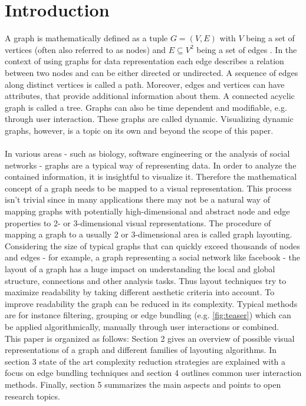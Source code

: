 \section{Introduction}
A graph is mathematically defined as a tuple $ G = (V, E)$ with $V$ being a set of vertices (often also referred to as nodes) and $E \subseteq V^2$ being a set of edges \cite{Al-Taie2017}. In the context of using graphs for data representation each edge describes a relation between two nodes and can be either directed or undirected. A sequence of edges along distinct vertices is called a path. Moreover, edges and vertices can have attributes, that provide additional information about them. A connected acyclic graph is called a tree. Graphs can also be time dependent and modifiable, e.g. through user interaction. These graphs are called dynamic. Visualizing dynamic graphs, however, is a topic on its own and beyond the scope of this paper.\\
\\
In various areas - such as biology, software engineering or the analysis of social networks - graphs are a typical way of representing data. In order to analyze the contained information, it is insightful to visualize it. Therefore the mathematical concept of a graph needs to be mapped to a visual representation. This process isn't trivial since in many applications there may not be a natural way of mapping graphs with potentially high-dimensional and abstract node and edge properties to 2- or 3-dimensional visual representations.
The procedure of mapping a graph to a usually 2 or 3-dimensional area is called graph layouting. 
Considering the size of typical graphs that can quickly exceed thousands of nodes and edges - for example, a graph representing a social network like facebook -  the layout of a graph has a huge impact on understanding the local and global structure, connections and other analysis tasks. Thus layout techniques try to maximize readability by taking different aesthetic criteria into account. To improve readability the graph can be reduced in its complexity. Typical methods are for instance filtering, grouping or edge bundling (e.g. \autoref{fig:teaser}) which can be applied algorithmically, manually through user interactions or combined. \\ This paper is organized as follows: Section 2 gives an overview of possible visual representations of a graph and different families of layouting algorithms. In section 3 state of the art complexity reduction strategies are explained with a focus on edge bundling techniques and section 4 outlines common user interaction methods. Finally, section 5 summarizes the main aspects and points to open research topics.

